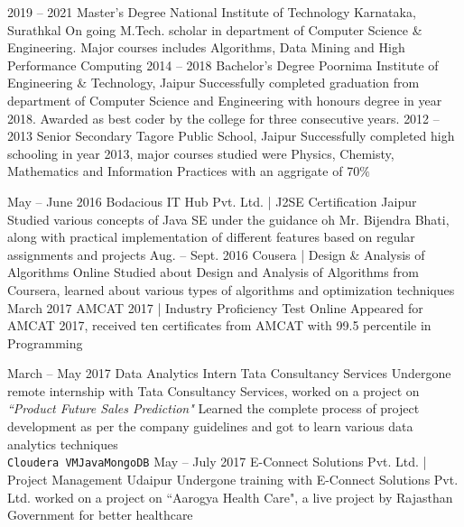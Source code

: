 \documentclass[9pt]{myOwnClass}
\begin{document}

\begin{entrylist}
	\entry
		{2019 -- 2021}
		{Master's Degree}
		{National Institute of Technology Karnataka, Surathkal}
		{On going M.Tech. scholar in department of Computer Science \& Engineering. Major courses includes Algorithms, Data Mining and High Performance Computing}
	\entry
		{2014 -- 2018}
		{Bachelor's Degree}
		{Poornima Institute of Engineering \& Technology, Jaipur}
		{Successfully completed graduation from department of Computer Science and Engineering with honours degree in year 2018. Awarded as best coder by the college for three consecutive years.}
	\entry
		{2012 -- 2013}
		{Senior Secondary}
		{Tagore Public School, Jaipur}
		{Successfully completed high schooling in year 2013, major courses studied were Physics, Chemisty, Mathematics and Information Practices with an aggrigate of 70$\%$}
\end{entrylist}


\begin{entrylist}
	\entry
		{May -- June 2016}
		{Bodacious IT Hub Pvt. Ltd. | J2SE Certification}
		{Jaipur}
		{Studied various concepts of Java SE under the guidance oh Mr. Bijendra Bhati, along with practical implementation of different features based on regular assignments and projects}
	\entry
		{Aug. -- Sept. 2016}
		{Cousera | Design \& Analysis of Algorithms}
		{Online}
		{Studied about Design and Analysis of Algorithms from Coursera, learned about various types of algorithms and optimization techniques}
	\entry
		{March 2017}
		{AMCAT 2017 | Industry Proficiency Test}
		{Online}
		{Appeared for AMCAT 2017, received ten certificates from AMCAT with 99.5 percentile in \\Programming}
\end{entrylist}


\begin{entrylist}
	\entry
		{March -- May 2017}
		{Data Analytics Intern}
		{Tata Consultancy Services}
		{Undergone remote internship with Tata Consultancy Services, worked on a project on \textit{``Product Future Sales Prediction"} Learned the complete process of project development as per the company guidelines and got to learn various data analytics techniques\\ \texttt{Cloudera VM}\slashsep\texttt{Java}\slashsep\texttt{MongoDB}}
	\entry
		{May -- July 2017}
		{E-Connect Solutions Pvt. Ltd. | Project Management}
		{Udaipur}
		{Undergone training with E-Connect Solutions Pvt. Ltd. worked on  a project on ``Aarogya Health Care", a live project by Rajasthan Government for better healthcare}
		
\end{entrylist}
\end{document}
